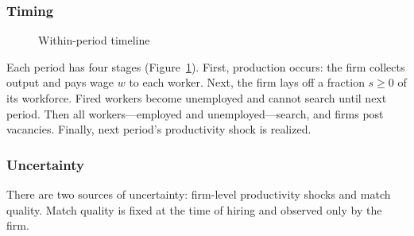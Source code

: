 \subsubsection*{Timing}
\begin{figure}
\centering
{}
\caption{Within-period timeline} \label{fig:Timing}
\end{figure}

Each period has four stages (Figure~\ref{fig:Timing}). First, production occurs: the firm collects output and pays wage $w$ to each worker. Next, the firm lays off a fraction $s\ge 0$ of its workforce. Fired workers become unemployed and cannot search until next period. Then all workers—employed and unemployed—search, and firms post vacancies. Finally, next period’s productivity shock is realized.

\subsubsection*{Uncertainty}

There are two sources of uncertainty: firm-level productivity shocks and match quality. Match quality is fixed at the time of hiring and observed only by the firm. 

